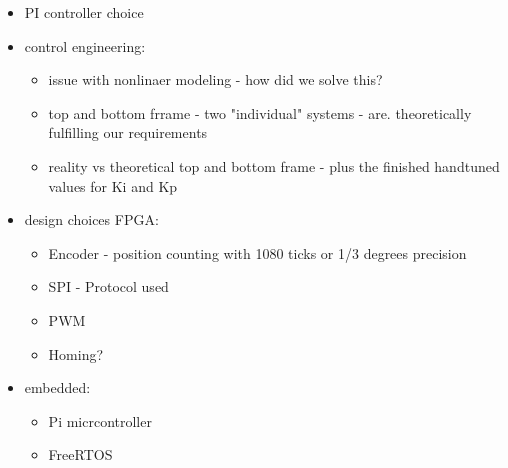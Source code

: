 \documentclass[../../main]{subfiles}
\begin{document}
\begin{itemize}
  \item PI controller choice
  \item control engineering:
  \begin{itemize}
    \item issue with nonlinaer modeling - how did we solve this?
    \item top and bottom frrame - two "individual" systems - are. theoretically fulfilling our requirements
    \item reality vs theoretical top and bottom frame - plus the finished handtuned values for Ki and Kp
  \end{itemize}
  \item design choices FPGA:
    \begin{itemize}
      \item Encoder - position counting with 1080 ticks or 1/3 degrees precision
      \item SPI - Protocol used
      \item PWM
      \item Homing?
    \end{itemize}
  \item embedded:
  \begin{itemize}
    \item Pi micrcontroller
    \item FreeRTOS
  \end{itemize}


\end{itemize}
\end{document}
